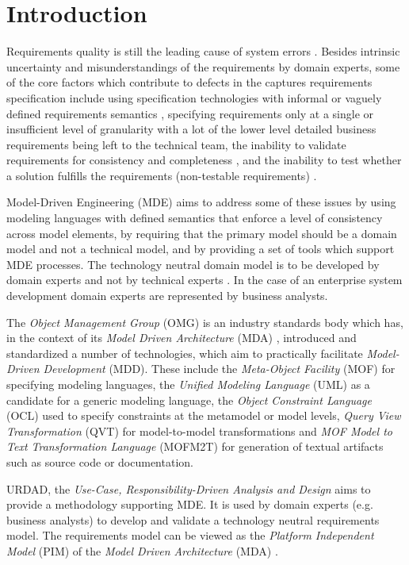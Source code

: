\section{Introduction}

Requirements quality is still the leading cause of system errors \cite{heck_experiences_2008}. Besides intrinsic uncertainty and misunderstandings of the requirements by domain experts, some of the core factors which contribute to defects in the captures requirements specification include using specification technologies with informal or vaguely defined requirements semantics \cite{ferguson_empirical_2006}, specifying requirements only at a single or insufficient level of granularity with a lot of the lower level detailed business requirements being left to the technical team, the inability to validate requirements for consistency and completeness \cite{somebodyPleaseFindASuitableReference}, and the inability to test whether a solution fulfills the requirements (non-testable requirements) \cite{bashardoust-tajali_extracting_2008}.

Model-Driven Engineering (MDE) aims to address some of these issues by using modeling languages with defined semantics that enforce a level of consistency across model elements, by requiring that the primary model should be a domain model and not a technical model, and by providing a set of tools which support MDE processes. The technology neutral domain model is to be developed by domain experts and not by technical experts \cite{asnina_computation_2010}. In the case of an enterprise system development domain experts are represented by business analysts.

The {\em Object Management Group} (OMG) is an industry standards body which has, in the context of its {\em Model Driven Architecture} (MDA) \cite{siegel_developing_2001}, introduced and standardized a number of technologies, which aim to practically facilitate {\em Model-Driven Development} (MDD). These include the {\em Meta-Object Facility} (MOF) for specifying modeling languages, the {\em Unified Modeling Language} (UML) as a candidate for a generic modeling language, the {\em Object Constraint Language} (OCL) used to specify constraints at the metamodel or model levels, {\em Query View Transformation} (QVT) for model-to-model transformations and {\em MOF Model to Text Transformation Language} (MOFM2T) for generation of textual artifacts such as source code or documentation. 

URDAD, the {\em Use-Case, Responsibility-Driven Analysis and Design} \cite{solms_technology_2007} aims to provide a methodology supporting MDE. It is used by domain experts (e.g. business analysts) to develop and validate a technology neutral requirements model. The requirements model can be viewed as the {\em Platform Independent Model} (PIM) of the {\em Model Driven Architecture} (MDA) \cite{solms_urdad_2010}.

